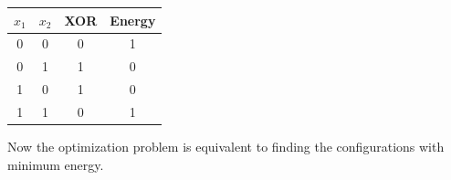\begin{table}[!htp]
    \centering
    \begin{tabular}{@{} c c | c c @{}}
        \toprule
        $x_1$ & $x_2$ & XOR & Energy \\
        \midrule
        0 & 0 & 0 & 1 \\
        0 & 1 & 1 & 0 \\
        1 & 0 & 1 & 0 \\
        1 & 1 & 0 & 1 \\
        \bottomrule
    \end{tabular}
\end{table}

\noindent
Now the optimization problem is equivalent to finding the configurations with minimum energy.

\newpage


